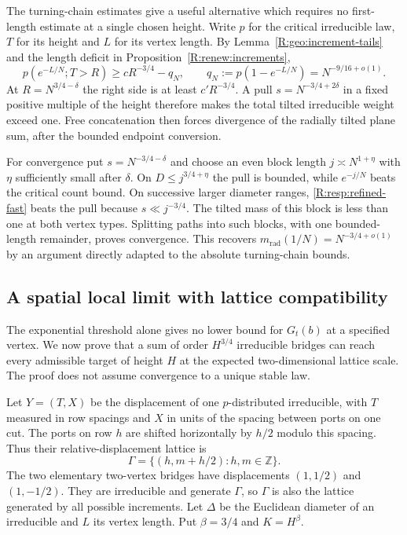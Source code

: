 \begin{remark}\label{R:resp:radial-alternative}
The turning-chain estimates give a useful alternative which requires no first-length estimate at a single chosen height. Write $p$ for the critical irreducible law, $T$ for its height and $L$ for its vertex length. By Lemma~\ref{R:geo:increment-tails} and the length deficit in Proposition~\ref{R:renew:increments},
\[
 p(e^{-L/N};T>R)\ge cR^{-3/4}-q_N,
 \qquad q_N:=p(1-e^{-L/N})=N^{-9/16+o(1)}.
\]
At $R=N^{3/4-\delta}$ the right side is at least $c'R^{-3/4}$. A pull $s=N^{-3/4+2\delta}$ in a fixed positive multiple of the height therefore makes the total tilted irreducible weight exceed one. Free concatenation then forces divergence of the radially tilted plane sum, after the bounded endpoint conversion.

For convergence put $s=N^{-3/4-\delta}$ and choose an even block length $j\asymp N^{1+\eta}$ with $\eta$ sufficiently small after $\delta$. On $D\le j^{3/4+\eta}$ the pull is bounded, while $e^{-j/N}$ beats the critical count bound. On successive larger diameter ranges, \eqref{R:resp:refined-fast} beats the pull because $s\ll j^{-3/4}$. The tilted mass of this block is less than one at both vertex types. Splitting paths into such blocks, with one bounded-length remainder, proves convergence. This recovers $m_{\mathrm{rad}}(1/N)=N^{-3/4+o(1)}$ by an argument directly adapted to the absolute turning-chain bounds.
\end{remark}

\subsection{A spatial local limit with lattice compatibility}
The exponential threshold alone gives no lower bound for $G_t(b)$ at a specified vertex. We now prove that a sum of order $H^{3/4}$ irreducible bridges can reach every admissible target of height $H$ at the expected two-dimensional lattice scale. The proof does not assume convergence to a unique stable law.

Let $Y=(T,X)$ be the displacement of one $p$-distributed irreducible, with $T$ measured in row spacings and $X$ in units of the spacing between ports on one cut. The ports on row $h$ are shifted horizontally by $h/2$ modulo this spacing. Thus their relative-displacement lattice is
\[
 \Gamma=\{(h,m+h/2):h,m\in\mathbb Z\}.
\]
The two elementary two-vertex bridges have displacements $(1,1/2)$ and $(1,-1/2)$. They are irreducible and generate $\Gamma$, so $\Gamma$ is also the lattice generated by all possible increments. Let $\Delta$ be the Euclidean diameter of an irreducible and $L$ its vertex length. Put $\beta=3/4$ and $K=H^\beta$.

